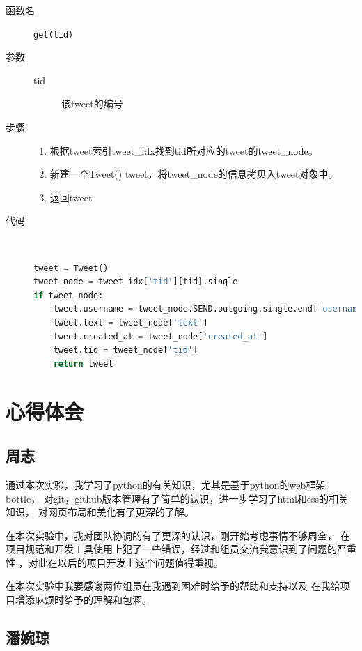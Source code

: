 \documentclass{yaldc}
\begin{document}
\begin{description}
    \item[函数名] \verb|get(tid)|
    \item[参数]
        \begin{description}
            \item[tid] 该tweet的编号
        \end{description}
    \item[步骤]
        \begin{enumerate}
            \item 根据tweet索引tweet\_idx找到tid所对应的tweet的tweet\_node。
            \item 新建一个Tweet() tweet，将tweet\_node的信息拷贝入tweet对象中。
            \item 返回tweet
        \end{enumerate}
    \item[代码] ~
        \begin{lstlisting}[language=Python]
tweet = Tweet()
tweet_node = tweet_idx['tid'][tid].single
if tweet_node:
    tweet.username = tweet_node.SEND.outgoing.single.end['username']
    tweet.text = tweet_node['text']
    tweet.created_at = tweet_node['created_at']
    tweet.tid = tweet_node['tid']
    return tweet
        \end{lstlisting}
\end{description}

\section{心得体会}

\subsection{周志}

通过本次实验，我学习了python的有关知识，尤其是基于python的web框架bottle，
对git，github版本管理有了简单的认识，进一步学习了html和css的相关知识，
对网页布局和美化有了更深的了解。

在本次实验中，我对团队协调的有了更深的认识，刚开始考虑事情不够周全，
在项目规范和开发工具使用上犯了一些错误，经过和组员交流我意识到了问题的严重性
，对此在以后的项目开发上这个问题值得重视。

在本次实验中我要感谢两位组员在我遇到困难时给予的帮助和支持以及
在我给项目增添麻烦时给予的理解和包涵。

\subsection{潘婉琼}
\end{document}

